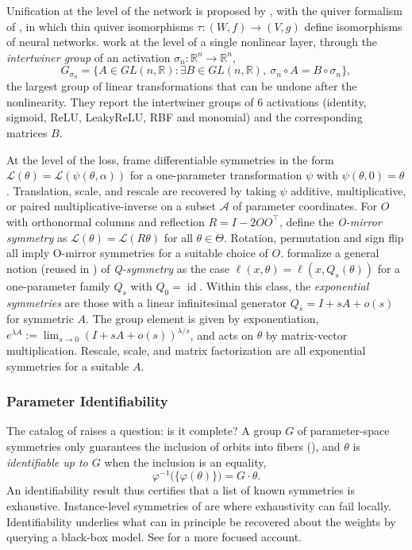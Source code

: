 \documentclass[mathematics,review,submit,moreauthors]{Definitions/mdpi}
\begin{document}
Unification at the level of the network is proposed by \citet{armenta2021a}, with the quiver formalism of , in which thin quiver isomorphisms $\tau: (W,f)\to (V,g)$ define isomorphisms of neural networks.
\citet{godfrey2022} work at the level of a single nonlinear layer, through the \emph{intertwiner group} of an activation $\sigma_n:\mathbb{R}^n\to\mathbb{R}^n$,
\begin{equation*}
    G_{\sigma_n}=\big\{A\in GL(n,\mathbb{R}) : \exists B\in GL(n,\mathbb{R}),\ \sigma_n\circ A=B\circ\sigma_n\big\},
\end{equation*}
the largest group of linear transformations that can be undone after the nonlinearity.
They report the intertwiner groups of $6$ activations (identity, sigmoid, ReLU, LeakyReLU, RBF and monomial) and the corresponding matrices $B$.

At the level of the loss, \citet{kunin2020} frame differentiable symmetries in the form $\mathcal{L}(\theta)=\mathcal{L}(\psi(\theta,\alpha))$ for a one-parameter transformation $\psi$ with $\psi(\theta,0)=\theta$.
Translation, scale, and rescale are recovered by taking $\psi$ additive, multiplicative, or paired multiplicative-inverse on a subset $\mathcal{A}$ of parameter coordinates.
For $O$ with orthonormal columns and reflection $R=I-2OO^{\top}$, \citet{ziyin2024} define the \emph{O-mirror symmetry} as $\mathcal{L}(\theta)=\mathcal{L}(R\theta)$ for all $\theta\in\Theta$.
Rotation, permutation and sign flip all imply O-mirror symmetries for a suitable choice of $O$.
\citet{ziyin2024a} formalize a general notion (reused in \citep{ziyin2025a}) of \emph{Q-symmetry} as the case $\ell(x,\theta)=\ell(x,Q_s(\theta))$ for a one-parameter family $Q_s$ with $Q_0=\operatorname{id}$.
Within this class, the \emph{exponential symmetries} are those with a linear infinitesimal generator $Q_s=I+sA+o(s)$ for symmetric $A$.
The group element is given by exponentiation, $e^{\lambda A}:=\lim_{s\to0}(I+sA+o(s))^{\lambda/s}$, and acts on $\theta$ by matrix-vector multiplication.
Rescale, scale, and matrix factorization are all exponential symmetries for a suitable $A$.

\subsubsection{Parameter Identifiability}\label{sec:parameter-identifiability}
The catalog of  raises a question: is it complete?
A group $G$ of parameter-space symmetries only guarantees the inclusion of orbits into fibers (), and $\theta$ is \emph{identifiable up to $G$} when the inclusion is an equality,
\begin{equation*}
    \varphi^{-1}\big(\{\varphi(\theta)\}\big)=G\cdot\theta.
\end{equation*}
An identifiability result thus certifies that a list of known symmetries is exhaustive.
Instance-level symmetries of  are where exhaustivity can fail locally.
Identifiability underlies what can in principle be recovered about the weights by querying a black-box model.
See \citet{zhao2025} for a more focused account.
\end{document}

